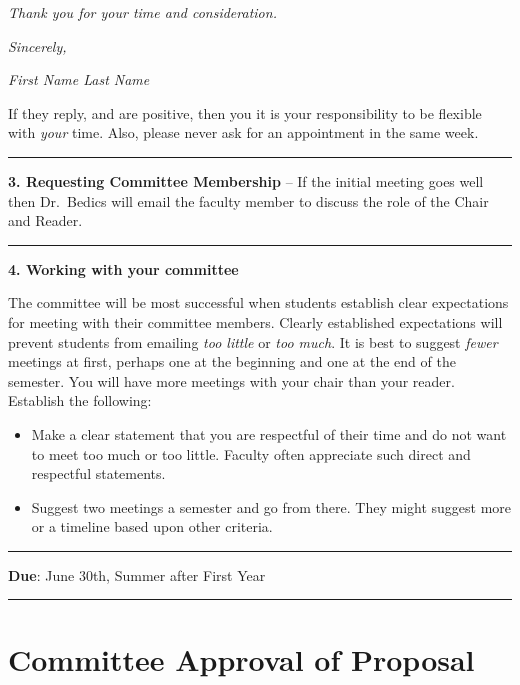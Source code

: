 \documentclass[
  openany]{book}
\begin{document}
\emph{Thank you for your time and consideration.}

\emph{Sincerely,}

\emph{First Name Last Name}

If they reply, and are positive, then you it is your responsibility to be flexible with \emph{your} time. Also, please never ask for an appointment in the same week.

\begin{center}\rule{0.5\linewidth}{0.5pt}\end{center}

\textbf{3. Requesting Committee Membership} -- If the initial meeting goes well then Dr.~Bedics will email the faculty member to discuss the role of the Chair and Reader.

\begin{center}\rule{0.5\linewidth}{0.5pt}\end{center}

\textbf{4. Working with your committee}

The committee will be most successful when students establish clear expectations for meeting with their committee members. Clearly established expectations will prevent students from emailing \emph{too little} or \emph{too much}. It is best to suggest \emph{fewer} meetings at first, perhaps one at the beginning and one at the end of the semester. You will have more meetings with your chair than your reader. Establish the following:

\begin{itemize}
\item
  Make a clear statement that you are respectful of their time and do not want to meet too much or too little. Faculty often appreciate such direct and respectful statements.
\item
  Suggest two meetings a semester and go from there. They might suggest more or a timeline based upon other criteria.
\end{itemize}

\begin{center}\rule{0.5\linewidth}{0.5pt}\end{center}

\textbf{Due}: June 30th, Summer after First Year

\begin{center}\rule{0.5\linewidth}{0.5pt}\end{center}

\hypertarget{committee-approval-of-proposal}{%
\section{Committee Approval of Proposal}\label{committee-approval-of-proposal}}
\end{document}
